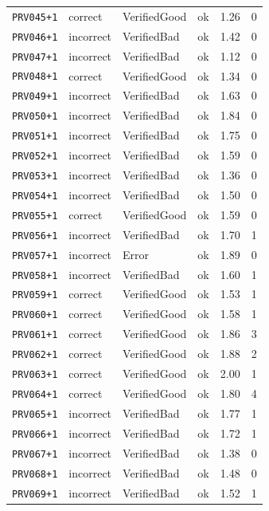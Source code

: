 \begin{longtable}{@{}l l l l r r@{}}
\texttt{PRV045{+}1} & correct & VerifiedGood & ok & 1.26 & 0 \\
\texttt{PRV046{+}1} & incorrect & VerifiedBad & ok & 1.42 & 0 \\
\texttt{PRV047{+}1} & incorrect & VerifiedBad & ok & 1.12 & 0 \\
\texttt{PRV048{+}1} & correct & VerifiedGood & ok & 1.34 & 0 \\
\texttt{PRV049{+}1} & incorrect & VerifiedBad & ok & 1.63 & 0 \\
\texttt{PRV050{+}1} & incorrect & VerifiedBad & ok & 1.84 & 0 \\
\texttt{PRV051{+}1} & incorrect & VerifiedBad & ok & 1.75 & 0 \\
\texttt{PRV052{+}1} & incorrect & VerifiedBad & ok & 1.59 & 0 \\
\texttt{PRV053{+}1} & incorrect & VerifiedBad & ok & 1.36 & 0 \\
\texttt{PRV054{+}1} & incorrect & VerifiedBad & ok & 1.50 & 0 \\
\texttt{PRV055{+}1} & correct & VerifiedGood & ok & 1.59 & 0 \\
\texttt{PRV056{+}1} & incorrect & VerifiedBad & ok & 1.70 & 1 \\
\texttt{PRV057{+}1} & incorrect & Error & ok & 1.89 & 0 \\
\texttt{PRV058{+}1} & incorrect & VerifiedBad & ok & 1.60 & 1 \\
\texttt{PRV059{+}1} & correct & VerifiedGood & ok & 1.53 & 1 \\
\texttt{PRV060{+}1} & correct & VerifiedGood & ok & 1.58 & 1 \\
\texttt{PRV061{+}1} & correct & VerifiedGood & ok & 1.86 & 3 \\
\texttt{PRV062{+}1} & correct & VerifiedGood & ok & 1.88 & 2 \\
\texttt{PRV063{+}1} & correct & VerifiedGood & ok & 2.00 & 1 \\
\texttt{PRV064{+}1} & correct & VerifiedGood & ok & 1.80 & 4 \\
\texttt{PRV065{+}1} & incorrect & VerifiedBad & ok & 1.77 & 1 \\
\texttt{PRV066{+}1} & incorrect & VerifiedBad & ok & 1.72 & 1 \\
\texttt{PRV067{+}1} & incorrect & VerifiedBad & ok & 1.38 & 0 \\
\texttt{PRV068{+}1} & incorrect & VerifiedBad & ok & 1.48 & 0 \\
\texttt{PRV069{+}1} & incorrect & VerifiedBad & ok & 1.52 & 1 \\

\end{longtable}
